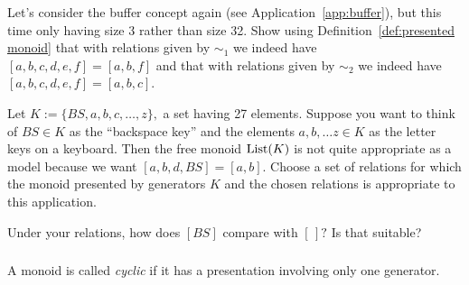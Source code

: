 \documentclass[CT4S-EN-RU]{subfiles}
\begin{document}
\begin{applicationRUS}[Buffer]\label{app:buffer}
\end{applicationRUS}

\begin{exerciseENG}\label{exc:buffer3}
Let's consider the buffer concept again (see Application~\ref{app:buffer}), but this time only having size 3 rather than size 32. Show using Definition~\ref{def:presented monoid} that with relations given by $\sim_1$ we indeed have $[a,b,c,d,e,f]=[a,b,f]$ and that with relations given by $\sim_2$ we indeed have $[a,b,c,d,e,f]=[a,b,c].$
\end{exerciseENG}

\begin{exerciseRUS}\label{exc:buffer3}
\end{exerciseRUS}

\begin{exerciseENG}
Let $K:=\{BS,a,b,c,\ldots,z\},$ a set having 27 elements. Suppose you want to think of $BS\in K$ as the “backspace key” and the elements $a,b,\ldots z\in K$ as the letter keys on a keyboard. Then the free monoid $\textnormal{List}(K)$ is not quite appropriate as a model because we want $[a,b,d,BS]=[a,b].$
\sexc Choose a set of relations for which the monoid presented by generators $K$ and the chosen relations is appropriate to this application.
\item Under your relations, how does $[BS]$ compare with $[\,]?$ Is that suitable?
\endsexc
\end{exerciseENG}

\begin{exerciseRUS}
\end{exerciseRUS}


\subsubsection{}

\begin{definitionENG}
A monoid is called {\em cyclic} if it has a presentation involving only one generator.
\end{definitionENG}

\begin{definitionRUS}
\end{definitionRUS}
\end{document}
